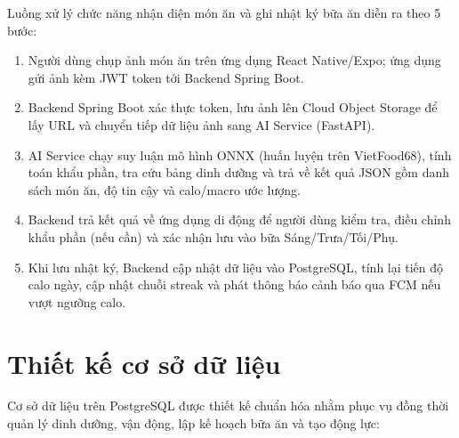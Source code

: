 \documentclass[../main.tex]{subfiles}
\begin{document}
Luồng xử lý chức năng nhận diện món ăn và ghi nhật ký bữa ăn diễn ra theo 5 bước:
\begin{enumerate}
    \item Người dùng chụp ảnh món ăn trên ứng dụng React Native/Expo; ứng dụng gửi ảnh kèm JWT token tới Backend Spring Boot.
    \item Backend Spring Boot xác thực token, lưu ảnh lên Cloud Object Storage để lấy URL và chuyển tiếp dữ liệu ảnh sang AI Service (FastAPI).
    \item AI Service chạy suy luận mô hình ONNX (huấn luyện trên VietFood68), tính toán khẩu phần, tra cứu bảng dinh dưỡng và trả về kết quả JSON gồm danh sách món ăn, độ tin cậy và calo/macro ước lượng.
    \item Backend trả kết quả về ứng dụng di động để người dùng kiểm tra, điều chỉnh khẩu phần (nếu cần) và xác nhận lưu vào bữa Sáng/Trưa/Tối/Phụ.
    \item Khi lưu nhật ký, Backend cập nhật dữ liệu vào PostgreSQL, tính lại tiến độ calo ngày, cập nhật chuỗi streak và phát thông báo cảnh báo qua FCM nếu vượt ngưỡng calo.
\end{enumerate}

\section{Thiết kế cơ sở dữ liệu}
\label{sec:3.4}

Cơ sở dữ liệu trên PostgreSQL được thiết kế chuẩn hóa nhằm phục vụ đồng thời quản lý dinh dưỡng, vận động, lập kế hoạch bữa ăn và tạo động lực:
\end{document}
